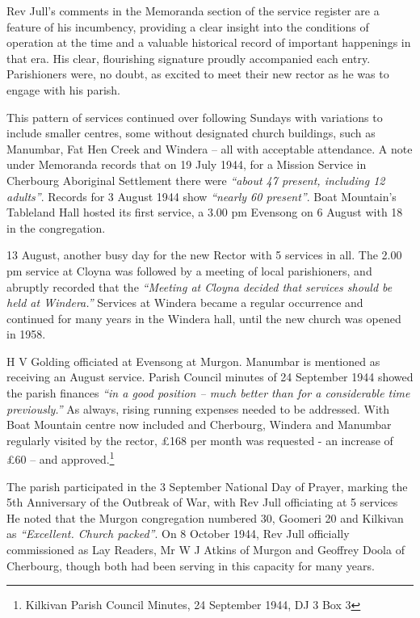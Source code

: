 Rev Jull's comments in the Memoranda section of the service register are a feature of his incumbency, providing a clear insight into the conditions of operation at the time and a valuable historical record of important happenings in that era. His clear, flourishing signature proudly accompanied each entry. Parishioners were, no doubt, as excited to meet their new rector as he was to engage with his parish.



This pattern of services continued over following Sundays with variations to include smaller centres, some without designated church buildings, such as Manumbar, Fat Hen Creek and Windera -- all with acceptable attendance. A note under Memoranda records that on 19 July 1944, for a Mission Service in Cherbourg Aboriginal Settlement there were \emph{``about 47 present, including 12 adults''}. Records for 3 August 1944 show \emph{``nearly 60 present''}. Boat Mountain's Tableland Hall hosted its first service, a 3.00 pm Evensong on 6 August with 18 in the congregation.



13 August, another busy day for the new Rector with 5 services in all. The 2.00 pm service at Cloyna was followed by a meeting of local parishioners, and abruptly recorded that the \emph{``Meeting at Cloyna decided that services should be held at Windera.''} Services at Windera became a regular occurrence and continued for many years in the Windera hall, until the new church was opened in 1958.



H V Golding officiated at Evensong at Murgon. Manumbar is mentioned as receiving an August service. Parish Council minutes of 24 September 1944 showed the parish finances \emph{``in a good position -- much better than for a considerable time previously.''} As always, rising running expenses needed to be addressed. With Boat Mountain centre now included and Cherbourg, Windera and Manumbar regularly visited by the rector, \pounds168 per month was requested - an increase of \pounds60 -- and approved.\footnote{Kilkivan Parish Council Minutes, 24 September 1944, DJ 3 Box 3}


The parish participated in the 3 September National Day of Prayer, marking the 5th Anniversary of the Outbreak of War, with Rev Jull officiating at 5 services He noted that the Murgon congregation numbered 30, Goomeri 20 and Kilkivan as \emph{``Excellent. Church packed''}. On 8 October 1944, Rev Jull officially commissioned as Lay Readers, Mr W J Atkins of Murgon and Geoffrey Doola of Cherbourg, though both had been serving in this capacity for many years.



